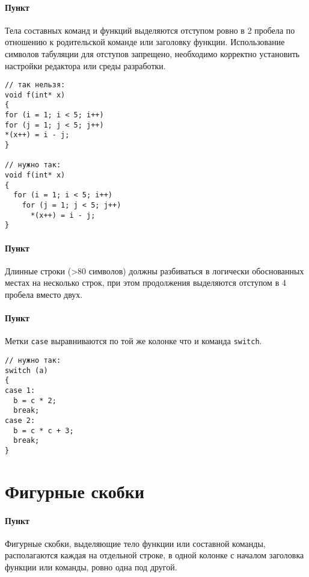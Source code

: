 \paragraph{Пункт}

Тела составных команд и функций выделяются отступом ровно в 2 пробела по
отношению к родительской команде или заголовку функции. Использование
символов табуляции для отступов запрещено, необходимо корректно
установить настройки редактора или среды разработки.

\begin{verbatim}
// так нельзя:
void f(int* x)
{
for (i = 1; i < 5; i++)
for (j = 1; j < 5; j++)
*(x++) = i - j;
}

// нужно так:
void f(int* x)
{
  for (i = 1; i < 5; i++)
    for (j = 1; j < 5; j++)
      *(x++) = i - j;
}
\end{verbatim}

\paragraph{Пункт}

Длинные строки (\textgreater{}80 символов) должны разбиваться в
логически обоснованных местах на несколько строк, при этом продолжения
выделяются отступом в 4 пробела вместо двух.

\paragraph{Пункт}

Метки \texttt{case} выравниваются по той же колонке что и команда
\texttt{switch}.

\begin{verbatim}
// нужно так:
switch (a)
{
case 1:
  b = c * 2;
  break;
case 2:
  b = c * c + 3;
  break;
}
\end{verbatim}


\section{Фигурные скобки}


\paragraph{Пункт}

Фигурные скобки, выделяющие тело функции или составной команды,
располагаются каждая на отдельной строке, в одной колонке с началом
заголовка функции или команды, ровно одна под другой.

